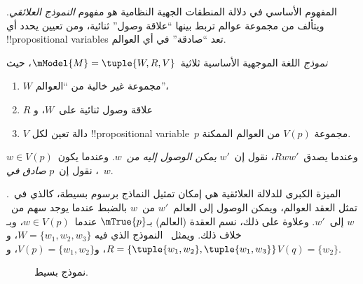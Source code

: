 \documentclass[../../../include/open-logic-section]{subfiles}
\begin{document}


المفهوم الأساسي في دلالة المنطقات الجهية النظامية هو مفهوم
\emph{النموذج العلائقي}. ويتألف من مجموعة عوالم تربط بينها ``علاقة
وصول'' ثنائية، ومن تعيين يحدد أي !!{propositional variable}s تعد
``صادقة'' في أي العوالم.

\begin{defn}
  \emph{نموذج} اللغة الموجهية الأساسية ثلاثية~$\mModel{M}
  = \tuple{W, R, V}$، حيث
  \begin{enumerate}
  \item $W$ مجموعة غير خالية من ``العوالم''،
  \item $R$ علاقة وصول ثنائية على~$W$، و
  \item $V$ دالة تعين لكل !!{propositional variable}~$p$ مجموعة
    $V(p)$ من العوالم الممكنة.
  \end{enumerate}
  وعندما يصدق~$Rww'$، نقول إن~$w'$ \emph{يمكن الوصول إليه من}~$w$.
  وعندما يكون~$w \in V(p)$، نقول إن~$p$ \emph{صادق في}~$w$.
\end{defn}

الميزة الكبرى للدلالة العلائقية هي إمكان تمثيل النماذج برسوم بسيطة،
كالذي في~. تمثل العقد العوالم، ويمكن الوصول إلى
العالم~$w'$ من~$w$ بالضبط عندما يوجد سهم من~$w$ إلى~$w'$. وعلاوة على
ذلك، نسم العقدة (العالم) بـ$\mTrue{p}$ عندما~$w \in V(p)$، وبـ
 خلاف ذلك. ويمثل~ النموذج الذي فيه
$W = \{w_1, w_2, w_3\}$، و$R = \{\tuple{w_1, w_2},\tuple{w_1,
  w_3}\}$، و$V(p) = \{w_1, w_2\}$، و$V(q) = \{w_2\}$.

\begin{figure}
  \begin{center}
  \end{center}
  \caption{نموذج بسيط.}
\end{figure}
\end{document}
